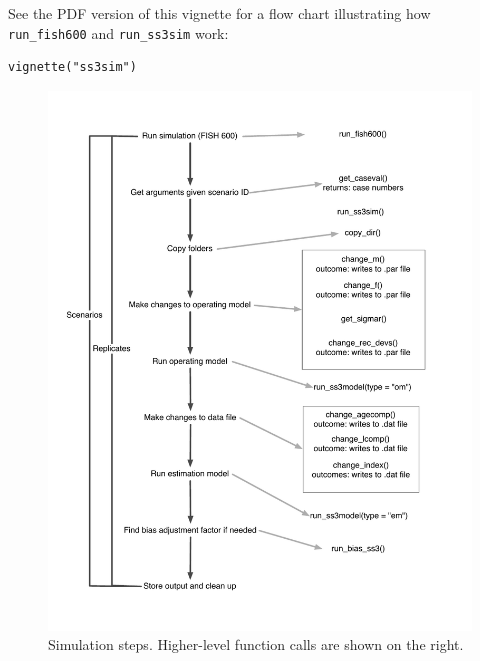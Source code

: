 \documentclass[12pt]{article}
\begin{document}
See the PDF version of this vignette for a flow chart illustrating how 
\texttt{run\_fish600} and \texttt{run\_ss3sim} work:

\begin{verbatim}
vignette("ss3sim")
\end{verbatim}

\begin{figure}[htbp]
  \centering
    \includegraphics[width=5.5in]{sim-steps.pdf}
  \caption{Simulation steps. Higher-level function calls are shown on the 
    right.}
  \label{fig:sim-steps}
\end{figure}
\end{document}

